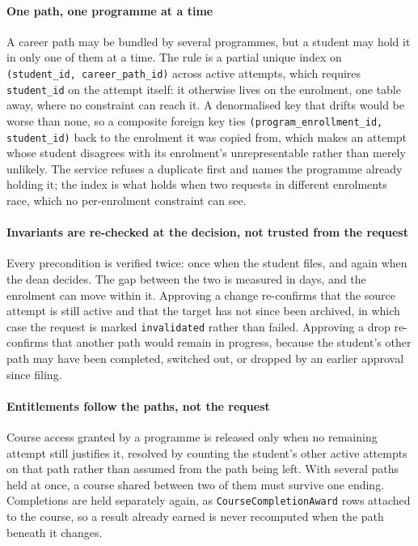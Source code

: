\paragraph{One path, one programme at a time}
A career path may be bundled by several programmes, but a student may hold it in only one of them at a time. The rule is a partial unique index on \texttt{(student\_id, career\_path\_id)} across active attempts, which requires \texttt{student\_id} on the attempt itself: it otherwise lives on the enrolment, one table away, where no constraint can reach it. A denormalised key that drifts would be worse than none, so a composite foreign key ties \texttt{(program\_enrollment\_id, student\_id)} back to the enrolment it was copied from, which makes an attempt whose student disagrees with its enrolment's unrepresentable rather than merely unlikely. The service refuses a duplicate first and names the programme already holding it; the index is what holds when two requests in different enrolments race, which no per-enrolment constraint can see.

\paragraph{Invariants are re-checked at the decision, not trusted from the request}
Every precondition is verified twice: once when the student files, and again when the dean decides. The gap between the two is measured in days, and the enrolment can move within it. Approving a change re-confirms that the source attempt is still active and that the target has not since been archived, in which case the request is marked \texttt{invalidated} rather than failed. Approving a drop re-confirms that another path would remain in progress, because the student's other path may have been completed, switched out, or dropped by an earlier approval since filing.

\paragraph{Entitlements follow the paths, not the request}
Course access granted by a programme is released only when no remaining attempt still justifies it, resolved by counting the student's other active attempts on that path rather than assumed from the path being left. With several paths held at once, a course shared between two of them must survive one ending. Completions are held separately again, as \texttt{CourseCompletionAward} rows attached to the course, so a result already earned is never recomputed when the path beneath it changes.

